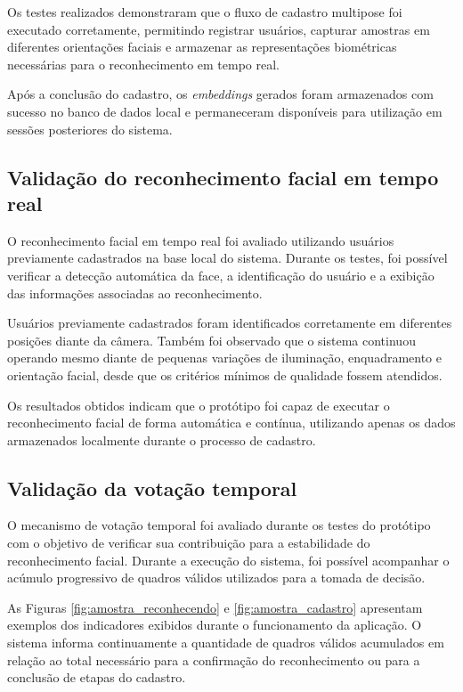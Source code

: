 Os testes realizados demonstraram que o fluxo de cadastro multipose foi executado corretamente, permitindo registrar usuários, capturar amostras em diferentes orientações faciais e armazenar as representações biométricas necessárias para o reconhecimento em tempo real.

Após a conclusão do cadastro, os \textit{embeddings} gerados foram armazenados com sucesso no banco de dados local e permaneceram disponíveis para utilização em sessões posteriores do sistema.

\subsection{Validação do reconhecimento facial em tempo real}

O reconhecimento facial em tempo real foi avaliado utilizando usuários previamente cadastrados na base local do sistema. Durante os testes, foi possível verificar a detecção automática da face, a identificação do usuário e a exibição das informações associadas ao reconhecimento.

Usuários previamente cadastrados foram identificados corretamente em diferentes posições diante da câmera. Também foi observado que o sistema continuou operando mesmo diante de pequenas variações de iluminação, enquadramento e orientação facial, desde que os critérios mínimos de qualidade fossem atendidos.

Os resultados obtidos indicam que o protótipo foi capaz de executar o reconhecimento facial de forma automática e contínua, utilizando apenas os dados armazenados localmente durante o processo de cadastro.

\subsection{Validação da votação temporal}

O mecanismo de votação temporal foi avaliado durante os testes do protótipo com o objetivo de verificar sua contribuição para a estabilidade do reconhecimento facial. Durante a execução do sistema, foi possível acompanhar o acúmulo progressivo de quadros válidos utilizados para a tomada de decisão.

As Figuras \ref{fig:amostra_reconhecendo} e \ref{fig:amostra_cadastro} apresentam exemplos dos indicadores exibidos durante o funcionamento da aplicação. O sistema informa continuamente a quantidade de quadros válidos acumulados em relação ao total necessário para a confirmação do reconhecimento ou para a conclusão de etapas do cadastro.

